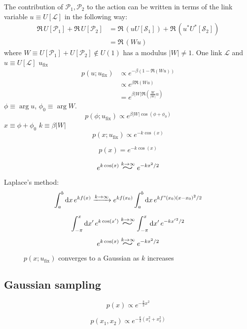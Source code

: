 The contribution of $\mathcal P_1, \mathcal P_2$ to the action can be written in terms of
the link variable $u \equiv U[\mathcal L]$ in the following way:
\[\begin{aligned}
    \Re\,U[\mathcal P_1] + \Re\,U[\mathcal P_2] &= \Re\,(uU[\mathcal S_1]) + \Re\,(u^*U^*[\mathcal S_2]) \\
                                                &= \Re\,(Wu)
\end{aligned}\]
where $W \equiv U[\mathcal P_1] + U[\mathcal P_2] \notin U(1)$ has a modulus $|W|\neq1$.
One link $\mathcal L$ and $u \equiv U[\mathcal L]$ $u_\mathrm{fix}$
\[\begin{aligned}
    p(u;u_\mathrm{fix}) &\propto e^{-\beta(1-\Re(Wu))} \\
                        &\propto e^{\beta\Re(Wu)} \\
                        &= e^{\beta|W|\Re\left(\frac{W}{|W|}u\right)}
\end{aligned}\]
$\phi \equiv \arg u$, $\phi_0 \equiv \arg W$.
\[
	p(\phi;u_\mathrm{fix}) \propto e^{\beta|W|\cos(\phi + \phi_0)}
\]
$x \equiv \phi + \phi_0$ $k \equiv \beta|W|$
\[
    p(x;u_\mathrm{fix}) \propto e^{-k\cos(x)}
\]

\[
	p(x) = e^{-k\cos(x)}
\]

\[
    e^{k\cos(x)} \stackrel{k\to\infty}{\scalebox{2}[1.25]{$\sim$}} e^{-kx^2/2}
\]

Laplace's method:
\[
	\int_a^b\mathrm dx\,e^{kf(x)} \xrightarrow{k\to\infty} e^{kf(x_0)}\int_a^b\mathrm dx\,e^{kf"(x_0)(x-x_0)^2/2}
\]

\[
    \int_{-\pi}^x\mathrm dx'\,e^{k\cos(x')} \stackrel{k\to\infty}{\scalebox{2}[1.25]{$\sim$}} \int_{-\pi}^x\mathrm dx'\,e^{-k{x'}^2/2}
\]
\[
    e^{k\cos(x)} \stackrel{k\to\infty}{\scalebox{2}[1.25]{$\sim$}} e^{-kx^2/2}
\]

\begin{figure}[!htb]
    \centering
    
    \caption{$p(x;u_\mathrm{fix})$ converges to a Gaussian as $k$ increases}
    \label{fig:gauss}
\end{figure}

\subsection*{Gaussian sampling}
\[
    p(x) \propto e^{-\frac{k}{2}x^2}
\]

\[
    p(x_1,x_2) \propto e^{-\frac{k}{2}(x_1^2+x_2^2)}
\]

